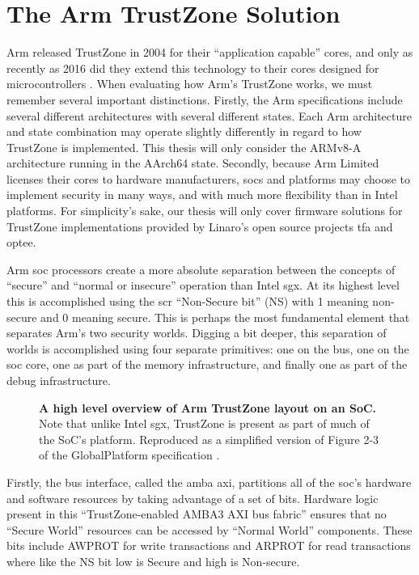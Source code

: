 \section{The Arm TrustZone Solution}
Arm released TrustZone in 2004 for their ``application capable'' cores, and only as recently as 2016 did they extend this technology to their cores designed for microcontrollers \cite{Pinto2019}. When evaluating how Arm’s TrustZone works, we must remember several important distinctions. Firstly, the Arm specifications include several different architectures with several different states. Each Arm architecture and state combination may operate slightly differently in regard to how TrustZone is implemented. This thesis will only consider the ARMv8-A architecture running in the AArch64 state. Secondly, because Arm Limited licenses their cores to hardware manufacturers, \glspl{soc} and platforms may choose to implement security in many ways, and with much more flexibility than in Intel platforms. For simplicity’s sake, our thesis will only cover firmware solutions for TrustZone implementations provided by Linaro's open source projects \gls{tfa} and \gls{optee}.
 
Arm \gls{soc} processors create a more absolute separation between the concepts of ``secure'' and ``normal or insecure'' operation than Intel \gls{sgx}. At its highest level this is accomplished using the \gls{scr} ``Non-Secure bit'' (NS) with 1 meaning non-secure and 0 meaning secure. This is perhaps the most fundamental element that separates Arm's two security worlds. Digging a bit deeper, this separation of worlds is accomplished using four separate primitives: one on the bus, one on the \gls{soc} core, one as part of the memory infrastructure, and finally one as part of the debug infrastructure.

\begin{figure}[hb]
\centering

\caption[High Level TrustZone Overview]{\textbf{A high level overview of Arm TrustZone layout on an SoC.} Note that unlike Intel \gls{sgx}, TrustZone is present as part of much of the SoC's platform. Reproduced as a simplified version of Figure 2-3 of the GlobalPlatform specification \cite{GlobalPlatform2018}.}
\label{fig:tz-hl}
\end{figure}

Firstly, the bus interface, called the \gls{amba} \gls{axi}, partitions all of the \gls{soc}’s hardware and software resources by taking advantage of a set of bits. Hardware logic present in this ``TrustZone-enabled AMBA3 AXI  bus fabric'' \cite{ArmBuildingSS} ensures that no ``Secure World'' resources can be accessed by ``Normal World'' components. These bits include AWPROT for write transactions and ARPROT for read transactions where like the NS bit low is Secure and high is Non-secure. 

